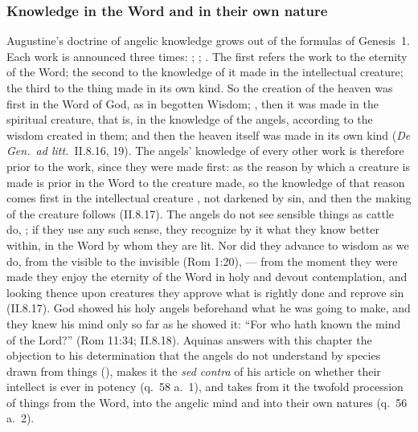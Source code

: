 \subsubsection{Knowledge in the Word and in their own nature}\label{sec:aug-knowledge}

Augustine's doctrine of angelic knowledge grows out of the formulas of
Genesis~1. Each work is announced three times: ; ; . The first refers the
work to the eternity of the Word; the second to the knowledge of it made in the
intellectual creature; the third to the thing made in its own kind. So the
creation of the heaven was first in the Word of God, as in begotten
Wisdom; , then it was
made in the spiritual creature, that is, in the knowledge of the angels,
according to the wisdom created in them; and then the heaven itself was
made in its own kind (\emph{De Gen.\ ad litt.}\ II.8.16, 19). The angels'
knowledge of every other work is therefore prior to the work, since they
were made first: as the reason by which a creature is made is prior in
the Word to the creature made, so the knowledge of that reason comes first
in the intellectual creature , not
darkened by sin, and then the making of the creature follows (II.8.17). The angels do not see sensible things as cattle do,
; if they use any such sense, they recognize
by it what they know better within, in the Word by whom they are lit. Nor
did they advance to wisdom as we do, from the visible to the invisible
(Rom 1:20),  --- from the moment they were made they
enjoy the eternity of the Word in holy and devout contemplation, and
looking thence upon creatures they approve what is rightly done and
reprove sin (II.8.17). God showed his holy angels beforehand what he was
going to make, and they knew his mind only so far as he showed it: ``For
who hath known the mind of the Lord?'' (Rom 11:34; II.8.18). Aquinas
answers with this chapter the objection to his determination that the
angels do not understand by species drawn from things (), makes it the \emph{sed contra} of his article on whether their
intellect is ever in potency (q.~58 a.~1), and takes from it the twofold
procession of things from the Word, into the angelic mind and into their
own natures (q.~56 a.~2).


